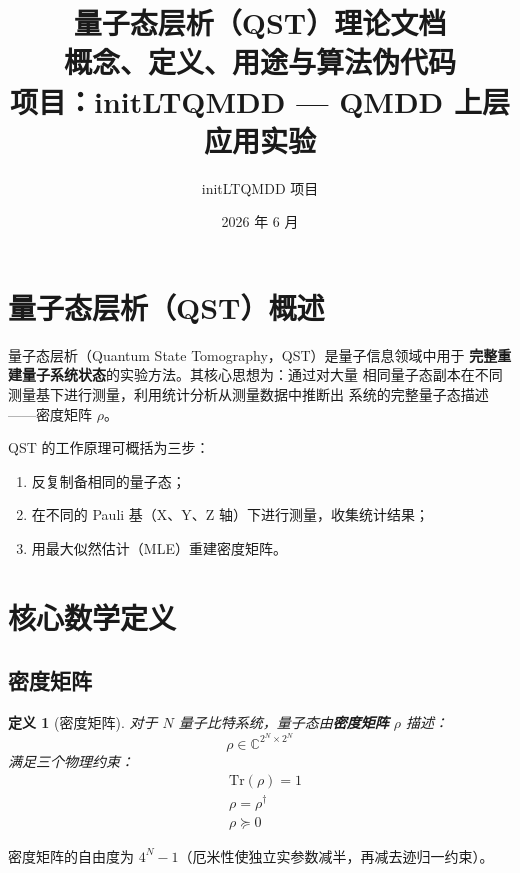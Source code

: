 \documentclass[12pt, a4paper]{article}
\title{%
    \vspace{-1cm}
    \textbf{量子态层析（QST）理论文档} \\[0.5em]
    \large 概念、定义、用途与算法伪代码 \\[0.5em]
    \normalsize 项目：initLTQMDD — QMDD 上层应用实验
}
\author{initLTQMDD 项目}
\date{2026 年 6 月}
\newtheorem{definition}{定义}
\begin{document}
\maketitle
\tableofcontents
\newpage

\section{量子态层析（QST）概述}

量子态层析（Quantum State Tomography，QST）是量子信息领域中用于
\textbf{完整重建量子系统状态}的实验方法。其核心思想为：通过对大量
相同量子态副本在不同测量基下进行测量，利用统计分析从测量数据中推断出
系统的完整量子态描述——密度矩阵 $\rho$。

QST 的工作原理可概括为三步：
\begin{enumerate}
    \item 反复制备相同的量子态；
    \item 在不同的 Pauli 基（X、Y、Z 轴）下进行测量，收集统计结果；
    \item 用最大似然估计（MLE）重建密度矩阵。
\end{enumerate}

\section{核心数学定义}

\subsection{密度矩阵}

\begin{definition}[密度矩阵]
对于 $N$ 量子比特系统，量子态由\textbf{密度矩阵} $\rho$ 描述：
\[
    \rho \in \mathbb{C}^{2^N \times 2^N}
\]
满足三个物理约束：
\begin{align}
    &\mathrm{Tr}(\rho) = 1 \tag{归一性} \\
    &\rho = \rho^\dagger \tag{厄米性} \\
    &\rho \succeq 0 \tag{半正定性}
\end{align}
\end{definition}

密度矩阵的自由度为 $4^N - 1$（厄米性使独立实参数减半，再减去迹归一约束）。
\end{document}
